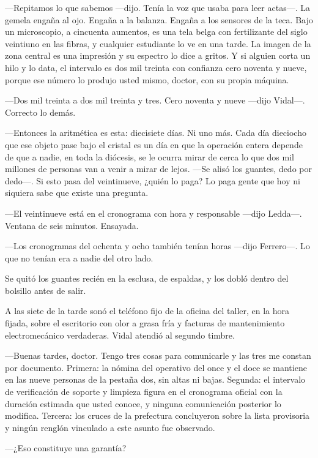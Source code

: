 ---Repitamos lo que sabemos ---dijo. Tenía la voz que usaba para leer actas---. La gemela engaña al ojo. Engaña a la balanza. Engaña a los sensores de la teca. Bajo un microscopio, a cincuenta aumentos, es una tela belga con fertilizante del siglo veintiuno en las fibras, y cualquier estudiante lo ve en una tarde. La imagen de la zona central es una impresión y su espectro lo dice a gritos. Y si alguien corta un hilo y lo data, el intervalo es dos mil treinta con confianza cero noventa y nueve, porque ese número lo produjo usted mismo, doctor, con su propia máquina.

---Dos mil treinta a dos mil treinta y tres. Cero noventa y nueve ---dijo Vidal---. Correcto lo demás.

---Entonces la aritmética es esta: diecisiete días. Ni uno más. Cada día dieciocho que ese objeto pase bajo el cristal es un día en que la operación entera depende de que a nadie, en toda la diócesis, se le ocurra mirar de cerca lo que dos mil millones de personas van a venir a mirar de lejos. ---Se alisó los guantes, dedo por dedo---. Si esto pasa del veintinueve, ¿quién lo paga? Lo paga gente que hoy ni siquiera sabe que existe una pregunta.

---El veintinueve está en el cronograma con hora y responsable ---dijo Ledda---. Ventana de seis minutos. Ensayada.

---Los cronogramas del ochenta y ocho también tenían horas ---dijo Ferrero---. Lo que no tenían era a nadie del otro lado.

Se quitó los guantes recién en la esclusa, de espaldas, y los dobló dentro del bolsillo antes de salir.

A las siete de la tarde sonó el teléfono fijo de la oficina del taller, en la hora fijada, sobre el escritorio con olor a grasa fría y facturas de mantenimiento electromecánico verdaderas. Vidal atendió al segundo timbre.

---Buenas tardes, doctor. Tengo tres cosas para comunicarle y las tres me constan por documento. Primera: la nómina del operativo del once y el doce se mantiene en las nueve personas de la pestaña dos, sin altas ni bajas. Segunda: el intervalo de verificación de soporte y limpieza figura en el cronograma oficial con la duración estimada que usted conoce, y ninguna comunicación posterior lo modifica. Tercera: los cruces de la prefectura concluyeron sobre la lista provisoria y ningún renglón vinculado a este asunto fue observado.

---¿Eso constituye una garantía?

